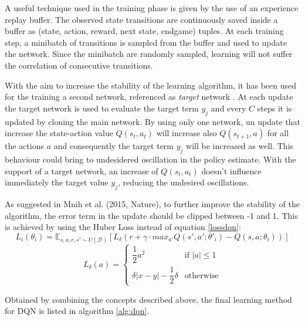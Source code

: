 \documentclass[article,11pt]{article}
\begin{document}
	A useful technique used in the training phase is given by the use of an experience replay buffer. The observed state transitions  are continuously saved inside a buffer as (state, action, reward, next state, endgame) tuples. At each training step, a minibatch of transitions is sampled from the buffer and used to update the network. Since the minibatch are randomly sampled, learning will not suffer the correlation of consecutive transitions.
	
	With the aim to increase the stability of the learning algorithm, it has been used for the training a second network, referenced as \textit{target} network \cite{dqn2015}. At each update the target network is used to evaluate the target term $y_j$ and every $C$ steps it is updated by cloning the main network. By using only one network, un update that increase the state-action value $Q(s_t, a_t)$ will increase also $Q(s_{t+1},a)$ for all the actions $a$ and consequently the target term $y_j$ will be increased as well. This behaviour could bring to undesidered oscillation in the policy estimate.  With the support of a target network, an increase of $Q(s_t, a_t)$ doesn't influence immediately the target value $y_j$, reducing the undesired oscillations.
	
	As suggested in Mnih et al. (2015, Nature), to further improve the stability of the algorithm,  the error term in the update should be clipped between -1 and 1. This is achieved by using the Huber Loss instead of equation \ref{lossdqn}:
	\begin{equation}
	L_i(\theta_i) = \mathbb{E}_{s,a,r,s'\sim U(\mathcal{D})} \left[L_\delta \left( r + \gamma\cdot max_{a'}Q(s',a'; \theta'_i) - Q(s,a;\theta_i) \right) \right]
	\end{equation}
	\begin{equation}
	L_{\delta}(a)  = 
	\begin{cases}
	\dfrac{1}{2}a^2 & \text{if $|a| \leq 1$}\\
	\delta|x-y| - \dfrac{1}{2}\delta & \text{otherwise}
	\end{cases}
	\end{equation}
	
	Obtained by combining the concepts described above, the final learning method for DQN is listed in algorithm \ref{alg:dqn}.
	
\end{document}
